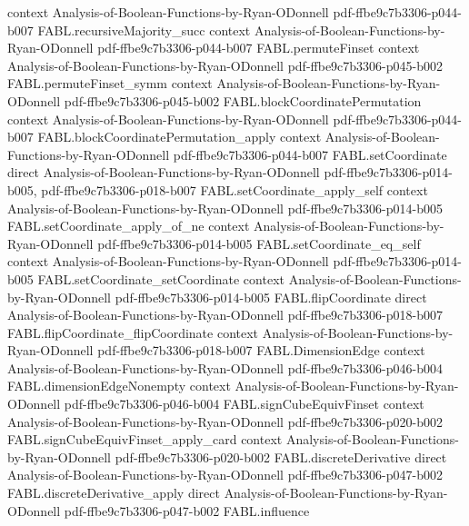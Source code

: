 \begin{theorem}
  {context}
  {Analysis-of-Boolean-Functions-by-Ryan-ODonnell}
  {pdf-ffbe9c7b3306-p044-b007}
\proofstep
  {FABL.recursiveMajority_succ}
  {context}
  {Analysis-of-Boolean-Functions-by-Ryan-ODonnell}
  {pdf-ffbe9c7b3306-p044-b007}
\proofstep
  {FABL.permuteFinset}
  {context}
  {Analysis-of-Boolean-Functions-by-Ryan-ODonnell}
  {pdf-ffbe9c7b3306-p045-b002}
\proofstep
  {FABL.permuteFinset_symm}
  {context}
  {Analysis-of-Boolean-Functions-by-Ryan-ODonnell}
  {pdf-ffbe9c7b3306-p045-b002}
\proofstep
  {FABL.blockCoordinatePermutation}
  {context}
  {Analysis-of-Boolean-Functions-by-Ryan-ODonnell}
  {pdf-ffbe9c7b3306-p044-b007}
\proofstep
  {FABL.blockCoordinatePermutation_apply}
  {context}
  {Analysis-of-Boolean-Functions-by-Ryan-ODonnell}
  {pdf-ffbe9c7b3306-p044-b007}
\proofstep
  {FABL.setCoordinate}
  {direct}
  {Analysis-of-Boolean-Functions-by-Ryan-ODonnell}
  {pdf-ffbe9c7b3306-p014-b005,
    pdf-ffbe9c7b3306-p018-b007}
\proofstep
  {FABL.setCoordinate_apply_self}
  {context}
  {Analysis-of-Boolean-Functions-by-Ryan-ODonnell}
  {pdf-ffbe9c7b3306-p014-b005}
\proofstep
  {FABL.setCoordinate_apply_of_ne}
  {context}
  {Analysis-of-Boolean-Functions-by-Ryan-ODonnell}
  {pdf-ffbe9c7b3306-p014-b005}
\proofstep
  {FABL.setCoordinate_eq_self}
  {context}
  {Analysis-of-Boolean-Functions-by-Ryan-ODonnell}
  {pdf-ffbe9c7b3306-p014-b005}
\proofstep
  {FABL.setCoordinate_setCoordinate}
  {context}
  {Analysis-of-Boolean-Functions-by-Ryan-ODonnell}
  {pdf-ffbe9c7b3306-p014-b005}
\proofstep
  {FABL.flipCoordinate}
  {direct}
  {Analysis-of-Boolean-Functions-by-Ryan-ODonnell}
  {pdf-ffbe9c7b3306-p018-b007}
\proofstep
  {FABL.flipCoordinate_flipCoordinate}
  {context}
  {Analysis-of-Boolean-Functions-by-Ryan-ODonnell}
  {pdf-ffbe9c7b3306-p018-b007}
\proofstep
  {FABL.DimensionEdge}
  {context}
  {Analysis-of-Boolean-Functions-by-Ryan-ODonnell}
  {pdf-ffbe9c7b3306-p046-b004}
\proofstep
  {FABL.dimensionEdgeNonempty}
  {context}
  {Analysis-of-Boolean-Functions-by-Ryan-ODonnell}
  {pdf-ffbe9c7b3306-p046-b004}
\proofstep
  {FABL.signCubeEquivFinset}
  {context}
  {Analysis-of-Boolean-Functions-by-Ryan-ODonnell}
  {pdf-ffbe9c7b3306-p020-b002}
\proofstep
  {FABL.signCubeEquivFinset_apply_card}
  {context}
  {Analysis-of-Boolean-Functions-by-Ryan-ODonnell}
  {pdf-ffbe9c7b3306-p020-b002}
\proofstep
  {FABL.discreteDerivative}
  {direct}
  {Analysis-of-Boolean-Functions-by-Ryan-ODonnell}
  {pdf-ffbe9c7b3306-p047-b002}
\proofstep
  {FABL.discreteDerivative_apply}
  {direct}
  {Analysis-of-Boolean-Functions-by-Ryan-ODonnell}
  {pdf-ffbe9c7b3306-p047-b002}
\proofstep
  {FABL.influence}

\end{theorem}
